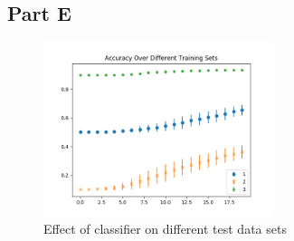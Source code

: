 \subsection{Part E}
\begin{figure}[h]
	\centering
	\includegraphics[width=0.6\textwidth]{../train1/data_sets.png}
	\caption{Effect of classifier on different test data sets}
\end{figure}